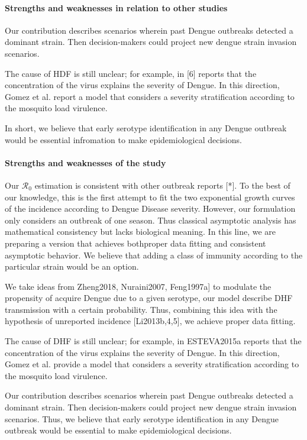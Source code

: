 \paragraph{Strengths and weaknesses in relation 
    to other studies}
    
    Our contribution describes scenarios wherein past Dengue outbreaks
detected a dominant strain. Then decision-makers could project new
dengue strain invasion scenarios.

    The cause of HDF is still unclear; for example, in [6] reports that
the concentration of the virus explains the severity of Dengue. In
this direction, Gomez et al. report a model that considers a severity
stratification according to the mosquito load virulence.

    In short, we believe that early serotype identification in any Dengue
outbreak would be essential infromation to make epidemiological decisions.
%
\paragraph{Strengths and weaknesses of the study} 
    Our $\mathcal{R}_0$ estimation is consistent with other outbreak reports [*].
To the best of our knowledge, this is the first attempt to fit the 
two exponential growth curves of the incidence according to Dengue 
Disease severity. However, our formulation only considers an outbreak
of one season. Thus classical asymptotic analysis has mathematical 
consistency but lacks biological meaning.  In this line, we are preparing
a version that achieves both\textemdash proper data fitting and consistent
asymptotic behavior. We believe that adding a class of immunity according
to the particular strain would be an option.

     We take ideas from Zheng2018, Nuraini2007, Feng1997a] to modulate 
the propensity of acquire Dengue due to a given serotype, 
our model describe DHF transmission with a certain probability.  
Thus, combining this idea with the hypothesis of unreported 
incidence [Li2013b,4,5], we achieve proper
data fitting. 

    The cause of DHF is still unclear; for example, in ESTEVA2015a reports
that the concentration of the virus explains the severity of Dengue.
In this direction, Gomez et al. provide a model that considers a
severity stratification according to the mosquito load virulence.

    Our contribution describes scenarios wherein past Dengue
outbreaks detected a dominant  strain. Then decision-makers could
project new dengue strain invasion scenarios. Thus, we believe that early 
serotype identification in any Dengue outbreak would be essential to  
make epidemiological decisions.

